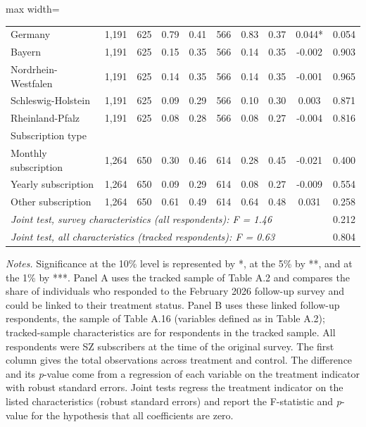 \begin{table}[H]
\begin{adjustbox}{max width=\textwidth}
\begin{tabular}{lccccccccc}
\hspace{2mm} Germany & 1,191 & 625 & 0.79 & 0.41 & 566 & 0.83 & 0.37 & 0.044* & 0.054 \\
\hspace{2mm} Bayern & 1,191 & 625 & 0.15 & 0.35 & 566 & 0.14 & 0.35 & -0.002 & 0.903 \\
\hspace{2mm} Nordrhein-Westfalen & 1,191 & 625 & 0.14 & 0.35 & 566 & 0.14 & 0.35 & -0.001 & 0.965 \\
\hspace{2mm} Schleswig-Holstein & 1,191 & 625 & 0.09 & 0.29 & 566 & 0.10 & 0.30 & 0.003 & 0.871 \\
\hspace{2mm} Rheinland-Pfalz & 1,191 & 625 & 0.08 & 0.28 & 566 & 0.08 & 0.27 & -0.004 & 0.816 \\
Subscription type & & & & & & & & & \\
\hspace{2mm} Monthly subscription & 1,264 & 650 & 0.30 & 0.46 & 614 & 0.28 & 0.45 & -0.021 & 0.400 \\
\hspace{2mm} Yearly subscription & 1,264 & 650 & 0.09 & 0.29 & 614 & 0.08 & 0.27 & -0.009 & 0.554 \\
\hspace{2mm} Other subscription & 1,264 & 650 & 0.61 & 0.49 & 614 & 0.64 & 0.48 & 0.031 & 0.258 \\
\multicolumn{8}{l}{\it Joint test, survey characteristics (all respondents): F = 1.46} & & 0.212 \\
\multicolumn{8}{l}{\it Joint test, all characteristics (tracked respondents): F = 0.63} & & 0.804 \\
\bottomrule
\end{tabular}
\end{adjustbox}
\par
\begin{minipage}{\linewidth}
\baselineskip9pt {\scriptsize \vspace{0.1cm} {\it Notes.} Significance at the 10\% level is represented by *, at the 5\% by **, and at the 1\% by ***. Panel A uses the tracked sample of Table A.2 and compares the share of individuals who responded to the February 2026 follow-up survey and could be linked to their treatment status. Panel B uses these linked follow-up respondents, the sample of Table A.16 (variables defined as in Table A.2); tracked-sample characteristics are for respondents in the tracked sample. All respondents were SZ subscribers at the time of the original survey. The first column gives the total observations across treatment and control. The difference and its {\it p}-value come from a regression of each variable on the treatment indicator with robust standard errors. Joint tests regress the treatment indicator on the listed characteristics (robust standard errors) and report the F-statistic and {\it p}-value for the hypothesis that all coefficients are zero.}
\end{minipage}
\end{table}
